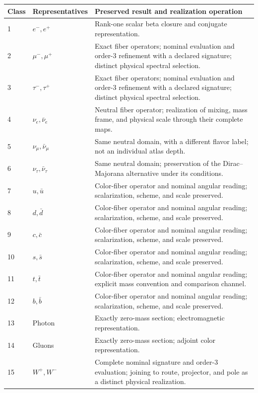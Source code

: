 \begin{table}[!htbp]
\centering\fontsize{9.2}{10.5}\selectfont
\setlength{\tabcolsep}{4pt}\renewcommand{\arraystretch}{1.04}
\begin{tabular}{@{}p{.11\linewidth}p{.20\linewidth}p{.62\linewidth}@{}}
 \toprule
 Class&Representatives&Preserved result and realization operation\\
 \midrule
 
 1&\(e^-,e^+\)&Rank-one scalar beta closure and conjugate representation.\\
 2&\(\mu^-,\mu^+\)&Exact fiber operators; nominal evaluation and order-\(3\) refinement with a declared signature; distinct physical spectral selection.\\
 3&\(\tau^-,\tau^+\)&Exact fiber operators; nominal evaluation and order-\(3\) refinement with a declared signature; distinct physical spectral selection.\\
 4&\(\nu_e,\bar\nu_e\)&Neutral fiber operator; realization of mixing, mass frame, and physical scale through their complete maps.\\
 5&\(\nu_\mu,\bar\nu_\mu\)&Same neutral domain, with a different flavor label; not an individual atlas depth.\\
 6&\(\nu_\tau,\bar\nu_\tau\)&Same neutral domain; preservation of the Dirac--Majorana alternative under its conditions.\\
 7&\(u,\bar u\)&Color-fiber operator and nominal angular reading; scalarization, scheme, and scale preserved.\\
 8&\(d,\bar d\)&Color-fiber operator and nominal angular reading; scalarization, scheme, and scale preserved.\\
 9&\(c,\bar c\)&Color-fiber operator and nominal angular reading; scalarization, scheme, and scale preserved.\\
 10&\(s,\bar s\)&Color-fiber operator and nominal angular reading; scalarization, scheme, and scale preserved.\\
 11&\(t,\bar t\)&Color-fiber operator and nominal angular reading; explicit mass convention and comparison channel.\\
 12&\(b,\bar b\)&Color-fiber operator and nominal angular reading; scalarization, scheme, and scale preserved.\\
 13&Photon&Exactly zero-mass section; electromagnetic representation.\\
 14&Gluons&Exactly zero-mass section; adjoint color representation.\\
 15&\(W^+,W^-\)&Complete nominal signature and order-\(3\) evaluation; joining to route, projector, and pole as a distinct physical realization.\\

\end{tabular}
\end{table}
